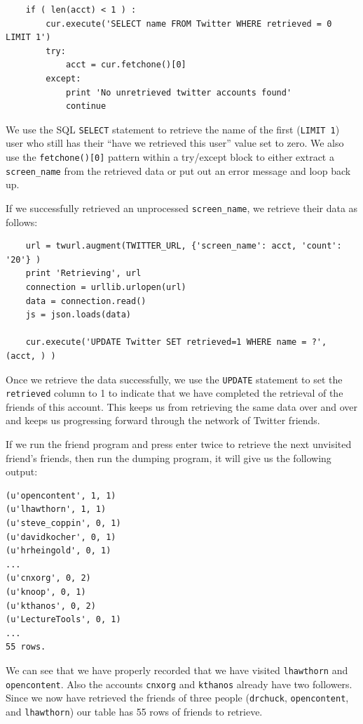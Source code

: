 \beforeverb
\begin{verbatim}
    if ( len(acct) < 1 ) :
        cur.execute('SELECT name FROM Twitter WHERE retrieved = 0 LIMIT 1')
        try:
            acct = cur.fetchone()[0]
        except:
            print 'No unretrieved twitter accounts found'
            continue
\end{verbatim}
\afterverb
%
We use the SQL {\tt SELECT} statement to retrieve the name of the first 
({\tt LIMIT 1}) user who still has their ``have we retrieved this user''
value set to zero.  We also use the {\tt fetchone()[0]} pattern within 
a try/except block to either extract a \verb"screen_name" from the retrieved
data or put out an error message and loop back up.

If we successfully retrieved an unprocessed \verb"screen_name", we retrieve
their data as follows:

\beforeverb
\begin{verbatim}
    url = twurl.augment(TWITTER_URL, {'screen_name': acct, 'count': '20'} )
    print 'Retrieving', url
    connection = urllib.urlopen(url)
    data = connection.read()
    js = json.loads(data)

    cur.execute('UPDATE Twitter SET retrieved=1 WHERE name = ?', (acct, ) )
\end{verbatim}
\afterverb
%
Once we retrieve the data successfully, we use the {\tt UPDATE} statement 
to set the {\tt retrieved} column to 1 to indicate that we have completed 
the retrieval of the friends of this account.  This keeps us from retrieving
the same data over and over and keeps us progressing forward through the network
of Twitter friends.

If we run the friend program and press enter twice to retrieve the next 
unvisited friend's friends,
then run the dumping program, it will give us the following output:

\beforeverb
\begin{verbatim}
(u'opencontent', 1, 1)
(u'lhawthorn', 1, 1)
(u'steve_coppin', 0, 1)
(u'davidkocher', 0, 1)
(u'hrheingold', 0, 1)
...
(u'cnxorg', 0, 2)
(u'knoop', 0, 1)
(u'kthanos', 0, 2)
(u'LectureTools', 0, 1)
...
55 rows.
\end{verbatim}
\afterverb
%
We can see that we have properly recorded that we have visited 
{\tt lhawthorn} and {\tt opencontent}.  Also the accounts 
{\tt cnxorg} and {\tt kthanos} already have two followers.
Since we now have retrieved the friends of three people
({\tt drchuck}, {\tt opencontent}, and {\tt lhawthorn}) our table has 55 rows 
of friends to retrieve.

